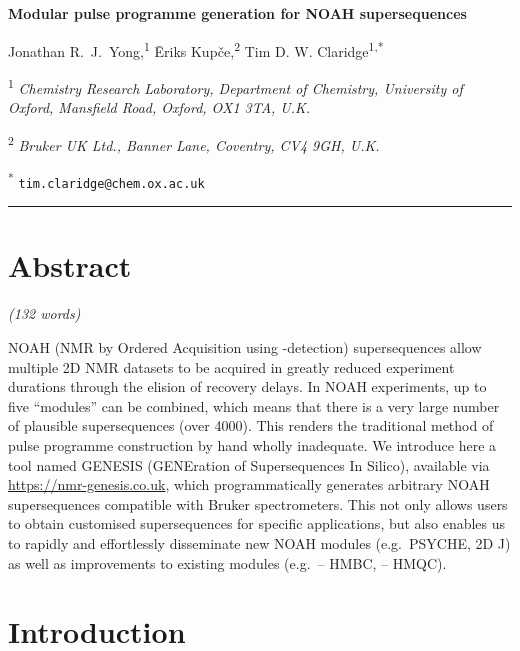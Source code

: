 \documentclass[a4paper,11pt]{article}
\newcommand{\genesistitle}{Modular pulse programme generation for NOAH supersequences}
\newcommand{\crl}{Chemistry Research Laboratory, Department of Chemistry, University of Oxford, Mansfield Road, Oxford, OX1 3TA, U.K.}
\newcommand{\brukeruk}{Bruker UK Ltd., Banner Lane, Coventry, CV4 9GH, U.K.}
\newcommand{\proton}{\ch{^{1}H}}
\newcommand{\carbon}{\ch{^{13}C}}
\newcommand{\nitrogen}{\ch{^{15}N}}
\newcommand{\CH}{\carbon{}--\proton{}}
\newcommand{\NH}{\nitrogen{}--\proton{}}
\newcommand{\theurl}{\url{https://nmr-genesis.co.uk}}
\begin{document}
\begin{refsection}

\begin{center}   %
    \textbf{\Large \genesistitle{}}

    \vspace{0.2cm}

    Jonathan R.\ J.\ Yong,\textsuperscript{1} {\=E}riks Kup{\v{c}}e,\textsuperscript{2} Tim D. W. Claridge\textsuperscript{1,*}

    \vspace{0.2cm}

    \textsuperscript{1} \textit{\crl{}}

    \textsuperscript{2} \textit{\brukeruk{}}

    \textsuperscript{*} \texttt{tim.claridge@chem.ox.ac.uk}

    \vspace{0.5cm} \hrule
\end{center}

\section*{Abstract}

\textit{(132 words)}

NOAH (NMR by Ordered Acquisition using \proton{}-detection) supersequences allow multiple 2D NMR datasets to be acquired in greatly reduced experiment durations through the elision of recovery delays.
In NOAH experiments, up to five ``modules'' can be combined, which means that there is a very large number of plausible supersequences (over 4000).
This renders the traditional method of pulse programme construction by hand wholly inadequate.
We introduce here a tool named GENESIS (GENEration of Supersequences In Silico), available via \theurl{}, which programmatically generates arbitrary NOAH supersequences compatible with Bruker spectrometers.
This not only allows users to obtain customised supersequences for specific applications, but also enables us to rapidly and effortlessly disseminate new NOAH modules (e.g.\ PSYCHE, 2D J) as well as improvements to existing modules (e.g.\ \CH{} HMBC, \NH{} HMQC).

\section{Introduction}


\end{refsection}
\end{document}
